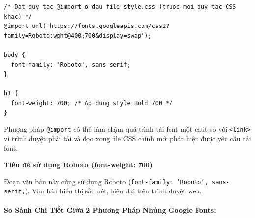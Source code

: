 \documentclass[11pt,oneside]{book}
\newcommand{\codeinline}[1]{\textcolor{accentOrange}{\texttt{#1}}}
\begin{document}
\begin{codeWindow}
\begin{lstlisting}[language=CSS3]
/* Dat quy tac @import o dau file style.css (truoc moi quy tac CSS khac) */
@import url('https://fonts.googleapis.com/css2?family=Roboto:wght@400;700&display=swap');

body {
  font-family: 'Roboto', sans-serif;
}

h1 {
  font-weight: 700; /* Ap dung style Bold 700 */
}
\end{lstlisting}
\end{codeWindow}

\begin{warnBox}
Phương pháp \codeinline{@import} có thể làm chậm quá trình tải font một chút so với \codeinline{<link>} vì trình duyệt phải tải và đọc xong file CSS chính mới phát hiện được yêu cầu tải font.
\end{warnBox}

\begin{browserWindow}
\begin{tcolorbox}[arc=4pt, colback=white, colframe=primaryBlue!30, boxrule=0.8pt, top=10pt, bottom=10pt, left=12pt, right=12pt]
  {\sffamily\bfseries\color{primaryBlue}\Large Tiêu đề sử dụng Roboto (font-weight: 700)}\par\vspace{6pt}
  {\sffamily\small Đoạn văn bản này cũng sử dụng Roboto (\codeinline{font-family: 'Roboto', sans-serif;}). Văn bản hiển thị sắc nét, hiện đại trên trình duyệt web.}
\end{tcolorbox}
\end{browserWindow}

\paragraph{So Sánh Chi Tiết Giữa 2 Phương Pháp Nhúng Google Fonts:}
\end{document}
